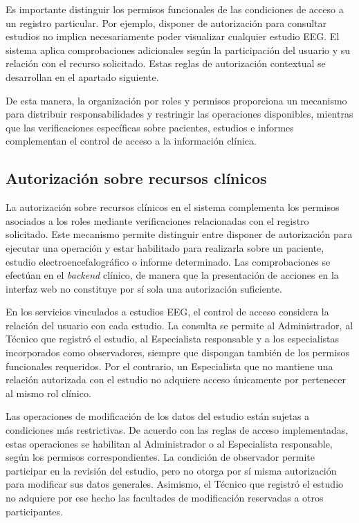 Es importante distinguir los permisos funcionales de las condiciones de acceso a un registro particular. Por ejemplo, disponer de autorización para consultar estudios no implica necesariamente poder visualizar cualquier estudio EEG. El sistema aplica comprobaciones adicionales según la participación del usuario y su relación con el recurso solicitado. Estas reglas de autorización contextual se desarrollan en el apartado siguiente.

De esta manera, la organización por roles y permisos proporciona un mecanismo para distribuir responsabilidades y restringir las operaciones disponibles, mientras que las verificaciones específicas sobre pacientes, estudios e informes complementan el control de acceso a la información clínica.


\subsection{Autorización sobre recursos clínicos}
\label{subsec:autorizacion-recursos-clinicos}

La autorización sobre recursos clínicos en el sistema complementa los permisos asociados a los roles mediante verificaciones relacionadas con el registro solicitado. Este mecanismo permite distinguir entre disponer de autorización para ejecutar una operación y estar habilitado para realizarla sobre un paciente, estudio electroencefalográfico o informe determinado. Las comprobaciones se efectúan en el \textit{backend} clínico, de manera que la presentación de acciones en la interfaz web no constituye por sí sola una autorización suficiente.

En los servicios vinculados a estudios EEG, el control de acceso considera la relación del usuario con cada estudio. La consulta se permite al Administrador, al Técnico que registró el estudio, al Especialista responsable y a los especialistas incorporados como observadores, siempre que dispongan también de los permisos funcionales requeridos. Por el contrario, un Especialista que no mantiene una relación autorizada con el estudio no adquiere acceso únicamente por pertenecer al mismo rol clínico.

Las operaciones de modificación de los datos del estudio están sujetas a condiciones más restrictivas. De acuerdo con las reglas de acceso implementadas, estas operaciones se habilitan al Administrador o al Especialista responsable, según los permisos correspondientes. La condición de observador permite participar en la revisión del estudio, pero no otorga por sí misma autorización para modificar sus datos generales. Asimismo, el Técnico que registró el estudio no adquiere por ese hecho las facultades de modificación reservadas a otros participantes.

